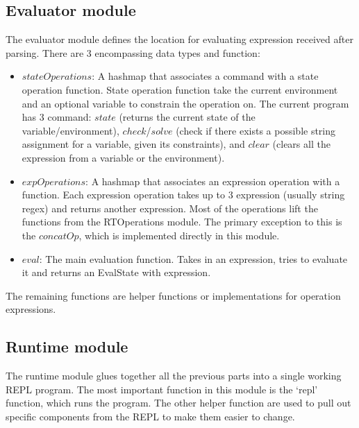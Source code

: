 \documentclass[letterpaper, 11pt]{article}
\begin{document}
\subsection{Evaluator module}\label{code:eval}
The evaluator module defines the location for evaluating expression received after parsing. There are 3 encompassing data types and function:
\begin{itemize}[itemsep=-0.3em]
    \item $stateOperations$: A hashmap that associates a command with a state operation function. State operation function take the current environment and an optional variable to constrain the operation on. The current program has 3 command: $state$ (returns the current state of the variable/environment), $check$/$solve$ (check if there exists a possible string assignment for a variable, given its constraints), and $clear$ (clears all the expression from a variable or the environment). 
    \item $expOperations$: A hashmap that associates an expression operation with a function. Each expression operation takes up to 3 expression (usually string regex) and returns another expression. Most of the operations lift the functions from the RTOperations module. The primary exception to this is the $concatOp$, which is implemented directly in this module.
    \item $eval$: The main evaluation function. Takes in an expression, tries to evaluate it and returns an EvalState with expression. 
\end{itemize}
The remaining functions are helper functions or implementations for operation expressions. 

\subsection{Runtime module}\label{code:runtime}
The runtime module glues together all the previous parts into a single working REPL program.
The most important function in this module is the `repl' function, which runs the program.
The other helper function are used to pull out specific components from the REPL to make them easier to change.
\end{document}
